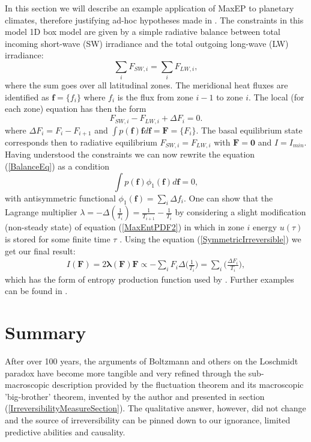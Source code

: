 \documentclass[a4paper,12pt]{article}
\begin{document}
In this section we will describe an example application of MaxEP to planetary climates, therefore justifying ad-hoc hypotheses made in \cite{Paltridge:2007jf}\cite{Lorenz:J80tzZkl}.
The constraints in this model 1D box model are given by a simple radiative balance between total incoming short-wave (SW) irradiance and the total outgoing long-wave (LW) irradiance:
\begin{equation}
\label{BalanceEq}
  \sum_i F_{SW,i}= \sum_i F_{LW,i},
\end{equation}
where the sum goes over all latitudinal zones. The meridional heat fluxes are identified as $\bm{f}=\{f_i\}$ where $f_i$ is the flux from zone $i-1$ to zone $i$. 
The local (for each zone) equation has then the form
\begin{equation}
  F_{SW,i}- F_{LW,i} + \Delta F_i = 0.
\end{equation}
where $\Delta F_i = F_i - F_{i+1}$ and $\int p(\bm{f})\bm{f} d\bm{f}=\bm{F}=\{F_i\}$. 
The basal equilibrium state corresponds then to radiative equilibrium $F_{SW,i}= F_{LW,i}$ with $\bm{F}=\bm{0}$ and $I=I_{min}$. Having understood the constraints we can now rewrite the equation (\ref{BalanceEq}) as a condition
\begin{equation}
  \int p(\bm{f})\phi_1(\bm{f})d\bm{f} =0,
\end{equation}
with antisymmetric functional $\phi_1(\bm{f})=\sum_i \Delta f_i$. 
One can show that the Lagrange multiplier $\lambda = - \Delta (\frac{1}{T_i}) = \frac{1}{T_{i+1}}-\frac{1}{T_i}$ by considering a slight modification (non-steady state) of equation (\ref{MaxEntPDF2}) in which in zone $i$ energy $u(\tau)$ is stored for some finite time $\tau$ \cite{Dewar:2014ek}. 
Using the equation (\ref{SymmetricIrreversible}) we get our final result:
\begin{equation}
\begin{aligned}
  I(\bm{F})=2 \bm{\lambda}(\bm{F})\bm{F} \propto - \sum_i F_i \Delta\bigg(\frac{1}{T_i}\bigg)= \sum_i \bigg(\frac{\Delta F_i}{T_i}\bigg),
\end{aligned}
\end{equation}
which has the form of entropy production function used by \cite{Paltridge:2007jf, Lorenz:J80tzZkl}.
Further examples can be found in \cite{Dewar:2014ek}.
\section{Summary}

After over 100 years, the arguments of Boltzmann and others on the Loschmidt paradox have become more tangible and very refined through the sub-macroscopic description provided by the fluctuation theorem and its macroscopic 'big-brother' theorem, invented by the author and presented in section (\ref{IrreversibilityMeasureSection}). The qualitative answer, however, did not change and the source of irreversibility can be pinned down to our ignorance, limited predictive abilities and causality.
\end{document}

